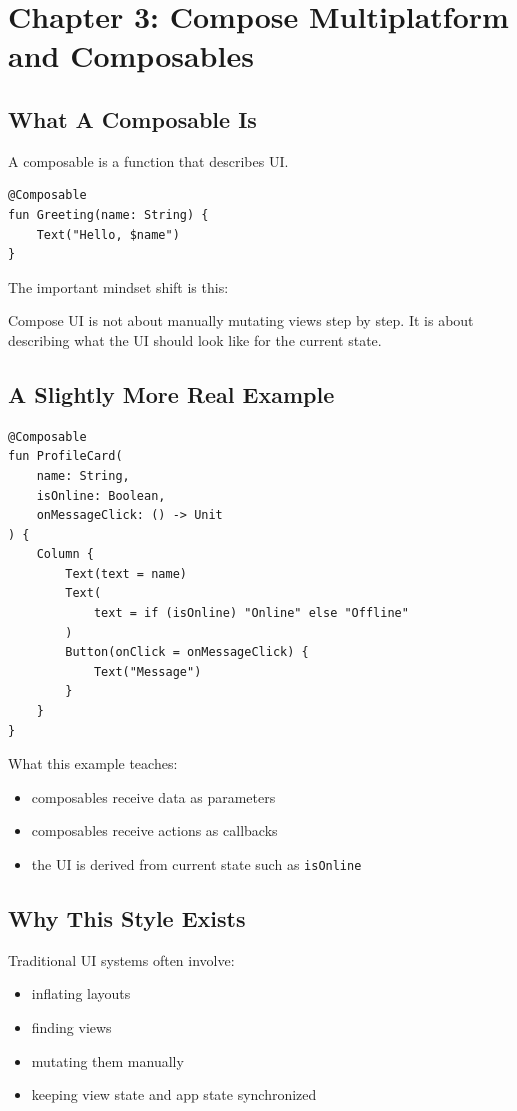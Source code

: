 \documentclass[11pt,a4paper]{article}
\begin{document}
\section{Chapter 3: Compose Multiplatform and Composables}

\subsection{What A Composable Is}

A composable is a function that describes UI.

\begin{lstlisting}[style=kazekotlin]
@Composable
fun Greeting(name: String) {
    Text("Hello, $name")
}
\end{lstlisting}

The important mindset shift is this:

Compose UI is not about manually mutating views step by step.
It is about describing what the UI should look like for the current state.

\subsection{A Slightly More Real Example}

\begin{lstlisting}[style=kazekotlin]
@Composable
fun ProfileCard(
    name: String,
    isOnline: Boolean,
    onMessageClick: () -> Unit
) {
    Column {
        Text(text = name)
        Text(
            text = if (isOnline) "Online" else "Offline"
        )
        Button(onClick = onMessageClick) {
            Text("Message")
        }
    }
}
\end{lstlisting}

What this example teaches:
\begin{itemize}
    \item composables receive data as parameters
    \item composables receive actions as callbacks
    \item the UI is derived from current state such as \texttt{isOnline}
\end{itemize}

\subsection{Why This Style Exists}

Traditional UI systems often involve:
\begin{itemize}
    \item inflating layouts
    \item finding views
    \item mutating them manually
    \item keeping view state and app state synchronized
\end{itemize}
\end{document}
